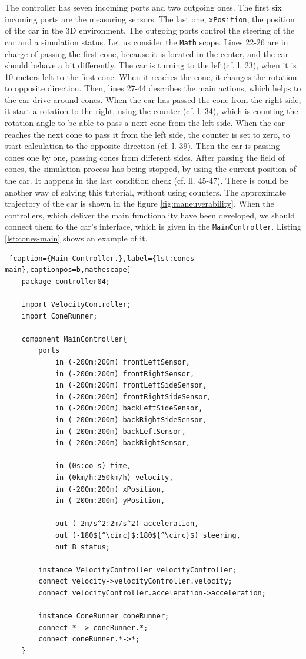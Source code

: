 The controller has seven incoming ports and two outgoing ones. The first six incoming ports are the measuring sensors. The last one, \texttt{xPosition}, the position of the car in the 3D environment. The outgoing ports control the steering of the car and a simulation status. Let us consider the \texttt{Math} scope. Lines 22-26 are in charge of passing the first cone, because it is located in the center, and the car should behave a bit differently. The car is turning to the left(cf. l. 23), when it is 10 meters left to the first cone. When it reaches the cone, it changes the rotation to opposite direction. Then, lines 27-44 describes the main actions, which helps to the car drive around cones. When the car has passed the cone from the right side, it start a rotation to the right, using the counter (cf. l. 34), which is counting the rotation angle to be able to pass a next cone from the left side. When the car reaches the next cone to pass it from the left side, the counter is set to zero, to start calculation to the opposite direction (cf. l. 39). Then the car is passing cones one by one, passing cones from different sides. After passing the field of cones, the simulation process has being stopped, by using the current position of the car. It happens in the last condition check (cf. ll. 45-47). There is could be another way of solving this tutorial, without using counters. The approximate trajectory of the car is shown in the figure \ref{fig:maneuverability}. When the controllers, which deliver the main functionality have been developed, we should connect them to the car's interface, which is given in the \texttt{MainController}. Listing \ref{lst:cones-main} shows an example of it.
\bigskip
\begin{lstlisting} [caption={Main Controller.},label={lst:cones-main},captionpos=b,mathescape]
    package controller04;

    import VelocityController;
    import ConeRunner;
    
    component MainController{
        ports 
            in (-200m:200m) frontLeftSensor,
            in (-200m:200m) frontRightSensor,
            in (-200m:200m) frontLeftSideSensor,
            in (-200m:200m) frontRightSideSensor,
            in (-200m:200m) backLeftSideSensor,
            in (-200m:200m) backRightSideSensor,
            in (-200m:200m) backLeftSensor,
            in (-200m:200m) backRightSensor,
    
            in (0s:oo s) time,
            in (0km/h:250km/h) velocity,
            in (-200m:200m) xPosition,
            in (-200m:200m) yPosition,
            
            out (-2m/s^2:2m/s^2) acceleration,
            out (-180${^\circ}$:180${^\circ}$) steering,
            out B status;
    
        instance VelocityController velocityController;
        connect velocity->velocityController.velocity;
        connect velocityController.acceleration->acceleration;
    
        instance ConeRunner coneRunner;
        connect * -> coneRunner.*;
        connect coneRunner.*->*; 
    }
\end{lstlisting}
